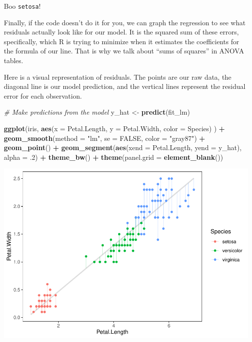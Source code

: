 \documentclass[
]{book}
\newenvironment{Shaded}{\begin{snugshade}}{\end{snugshade}}
\newcommand{\CommentTok}[1]{\textcolor[rgb]{0.56,0.35,0.01}{\textit{#1}}}
\newcommand{\DataTypeTok}[1]{\textcolor[rgb]{0.13,0.29,0.53}{#1}}
\newcommand{\FloatTok}[1]{\textcolor[rgb]{0.00,0.00,0.81}{#1}}
\newcommand{\KeywordTok}[1]{\textcolor[rgb]{0.13,0.29,0.53}{\textbf{#1}}}
\newcommand{\NormalTok}[1]{#1}
\newcommand{\OperatorTok}[1]{\textcolor[rgb]{0.81,0.36,0.00}{\textbf{#1}}}
\newcommand{\OtherTok}[1]{\textcolor[rgb]{0.56,0.35,0.01}{#1}}
\newcommand{\StringTok}[1]{\textcolor[rgb]{0.31,0.60,0.02}{#1}}
\begin{document}
Boo \texttt{setosa}!

Finally, if the code doesn't do it for you, we can graph the regression to see what residuals actually look like for our model. It is the squared sum of these errors, specifically, which R is trying to minimize when it estimates the coefficients for the formula of our line. That is why we talk about ``sums of squares'' in ANOVA tables.

Here is a visual representation of residuals. The points are our raw data, the diagonal line is our model prediction, and the vertical lines represent the residual error for each observation.

\begin{Shaded}
\begin{Highlighting}[]
\CommentTok{# Make predictions from the model}
\NormalTok{y_hat <-}\StringTok{ }\KeywordTok{predict}\NormalTok{(fit_lm)}

\KeywordTok{ggplot}\NormalTok{(iris, }\KeywordTok{aes}\NormalTok{(}\DataTypeTok{x =}\NormalTok{ Petal.Length, }\DataTypeTok{y =}\NormalTok{ Petal.Width, }\DataTypeTok{color =}\NormalTok{ Species) ) }\OperatorTok{+}
\StringTok{  }\KeywordTok{geom_smooth}\NormalTok{(}\DataTypeTok{method =} \StringTok{"lm"}\NormalTok{, }\DataTypeTok{se =} \OtherTok{FALSE}\NormalTok{, }\DataTypeTok{color =} \StringTok{"gray87"}\NormalTok{) }\OperatorTok{+}
\StringTok{  }\KeywordTok{geom_point}\NormalTok{() }\OperatorTok{+}
\StringTok{  }\KeywordTok{geom_segment}\NormalTok{(}\KeywordTok{aes}\NormalTok{(}\DataTypeTok{xend =}\NormalTok{ Petal.Length, }\DataTypeTok{yend =}\NormalTok{ y_hat), }\DataTypeTok{alpha =} \FloatTok{.2}\NormalTok{) }\OperatorTok{+}
\StringTok{  }\KeywordTok{theme_bw}\NormalTok{() }\OperatorTok{+}
\StringTok{  }\KeywordTok{theme}\NormalTok{(}\DataTypeTok{panel.grid =} \KeywordTok{element_blank}\NormalTok{())}
\end{Highlighting}
\end{Shaded}

\includegraphics{worstr_files/figure-latex/unnamed-chunk-225-1.pdf}
\end{document}
